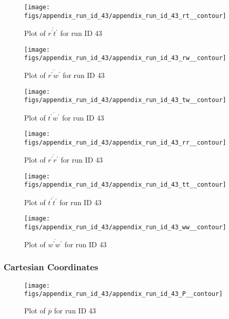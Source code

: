 \begin{figure}[H]
\centering
\texttt{[image: figs/appendix\_run\_id\_43/appendix\_run\_id\_43\_rt\_\_contour]}
\caption{Plot of $\overline{r^\prime t^\prime}$ for run ID 43}
\label{fig:appendix_run_id_43_rt__contour}
\end{figure}


\begin{figure}[H]
\centering
\texttt{[image: figs/appendix\_run\_id\_43/appendix\_run\_id\_43\_rw\_\_contour]}
\caption{Plot of $\overline{r^\prime w^\prime}$ for run ID 43}
\label{fig:appendix_run_id_43_rw__contour}
\end{figure}


\begin{figure}[H]
\centering
\texttt{[image: figs/appendix\_run\_id\_43/appendix\_run\_id\_43\_tw\_\_contour]}
\caption{Plot of $\overline{t^\prime w^\prime}$ for run ID 43}
\label{fig:appendix_run_id_43_tw__contour}
\end{figure}


\begin{figure}[H]
\centering
\texttt{[image: figs/appendix\_run\_id\_43/appendix\_run\_id\_43\_rr\_\_contour]}
\caption{Plot of $\overline{r^\prime r^\prime}$ for run ID 43}
\label{fig:appendix_run_id_43_rr__contour}
\end{figure}


\begin{figure}[H]
\centering
\texttt{[image: figs/appendix\_run\_id\_43/appendix\_run\_id\_43\_tt\_\_contour]}
\caption{Plot of $\overline{t^\prime t^\prime}$ for run ID 43}
\label{fig:appendix_run_id_43_tt__contour}
\end{figure}


\begin{figure}[H]
\centering
\texttt{[image: figs/appendix\_run\_id\_43/appendix\_run\_id\_43\_ww\_\_contour]}
\caption{Plot of $\overline{w^\prime w^\prime}$ for run ID 43}
\label{fig:appendix_run_id_43_ww__contour}
\end{figure}


\subsubsection{Cartesian Coordinates}
\begin{figure}[H]
\centering
\texttt{[image: figs/appendix\_run\_id\_43/appendix\_run\_id\_43\_P\_\_contour]}
\caption{Plot of $\overline{p}$ for run ID 43}
\label{fig:appendix_run_id_43_P__contour}
\end{figure}



